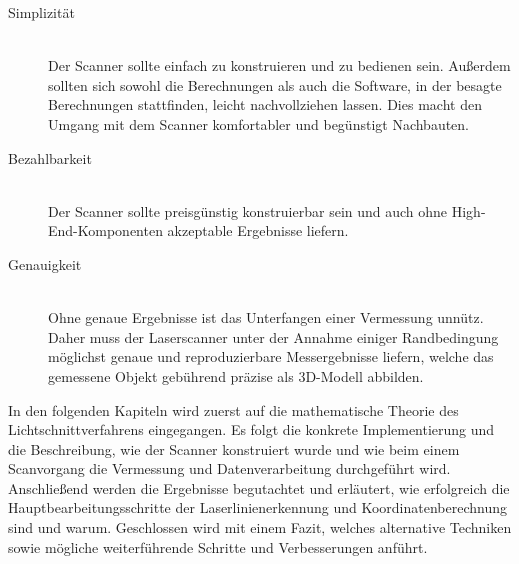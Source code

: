 \begin{description}
\item[Simplizität] \hfill \\
Der Scanner sollte einfach zu konstruieren und zu bedienen sein. Außerdem sollten sich sowohl die Berechnungen als auch die Software, in der besagte Berechnungen stattfinden, leicht nachvollziehen lassen. Dies macht den Umgang mit dem Scanner komfortabler und begünstigt Nachbauten.
\item[Bezahlbarkeit] \hfill \\		
Der Scanner sollte preisgünstig konstruierbar sein und auch ohne High-End-Komponenten akzeptable Ergebnisse liefern.  
\item[Genauigkeit] \hfill \\  		
Ohne genaue Ergebnisse ist das Unterfangen einer Vermessung unnütz. Daher muss der Laserscanner unter der Annahme einiger Randbedingung möglichst genaue und reproduzierbare Messergebnisse liefern, welche das gemessene Objekt gebührend präzise als 3D-Modell abbilden.
\end{description}
In den folgenden Kapiteln wird zuerst auf die mathematische Theorie des Lichtschnittverfahrens eingegangen. Es folgt die konkrete Implementierung und die Beschreibung, wie der Scanner konstruiert wurde und wie beim einem Scanvorgang die Vermessung und Datenverarbeitung durchgeführt wird. Anschließend werden die Ergebnisse begutachtet und erläutert, wie erfolgreich die Hauptbearbeitungsschritte der Laserlinienerkennung und Koordinatenberechnung sind und warum. Geschlossen wird mit einem Fazit, welches alternative Techniken sowie mögliche weiterführende Schritte und Verbesserungen anführt.  

